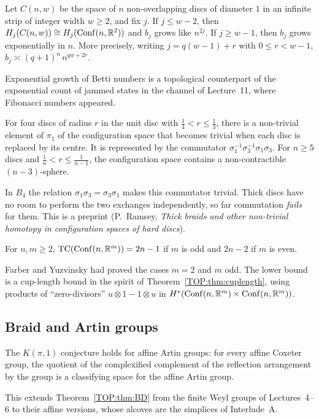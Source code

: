 \begin{theorem}\label{TOP:thm:AKM}
Let $C(n,w)$ be the space of $n$ non-overlapping discs of diameter $1$ in an infinite strip of integer width $w\ge2$, and fix
$j$. If $j\le w-2$, then $H_j(C(n,w))\cong H_j(\operatorname{Conf}(n,\mathbb{R}^2))$ and $b_j$ grows like $n^{2j}$. If $j\ge w-1$,
then $b_j$ grows exponentially in $n$. More precisely, writing $j=q(w-1)+r$ with $0\le r<w-1$,
$b_j\asymp(q+1)^n\,n^{qw+2r}$.
\end{theorem}
\noindent Exponential growth of Betti numbers is a topological counterpart of the exponential count of
jammed states in the channel of Lecture~11, where Fibonacci numbers appeared.

\begin{theorem}\label{TOP:thm:thick}
For four discs of radius $r$ in the unit disc with $\tfrac14<r\le\tfrac13$, there is a non-trivial
element of $\pi_1$ of the configuration space that becomes trivial when each disc is replaced by its centre.
It is represented by the commutator $\sigma_1^{-1}\sigma_3^{-1}\sigma_1\sigma_3$. For $n\ge5$ discs and
$\tfrac1n<r\le\tfrac1{n-1}$, the configuration space contains a non-contractible $(n-3)$-sphere.
\end{theorem}
\noindent In $B_4$ the relation $\sigma_1\sigma_3=\sigma_3\sigma_1$ makes this commutator trivial. Thick discs have
no room to perform the two exchanges independently, so far commutation \emph{fails} for them. This is a preprint (P.~Ramsey, \emph{Thick braids and other
non-trivial homotopy in configuration spaces of hard discs}).

\begin{theorem}\label{TOP:thm:farber}
For $n,m\ge2$, $\operatorname{TC}(\operatorname{Conf}(n,\mathbb{R}^m))=2n-1$ if $m$ is odd and $2n-2$ if $m$ is even.
\end{theorem}
\noindent Farber and Yuzvinsky had proved the cases $m=2$ and $m$ odd. The lower bound is a cup-length bound in the spirit of
Theorem~\ref{TOP:thm:cuplength}, using products of ``zero-divisors'' $u\otimes1-1\otimes u$ in
$H^*(\operatorname{Conf}(n,\mathbb{R}^m)\times\operatorname{Conf}(n,\mathbb{R}^m))$.

\subsection*{Braid and Artin groups}

\begin{theorem}\label{TOP:thm:PS}
The $K(\pi,1)$ conjecture holds for affine Artin groups: for every affine Coxeter group, the quotient of the
complexified complement of the reflection arrangement by the group is a classifying space for the
affine Artin group.
\end{theorem}
\noindent This extends Theorem~\ref{TOP:thm:BD} from the finite Weyl groups of Lectures~4--6 to their affine
versions, whose alcoves are the simplices of Interlude~A.

